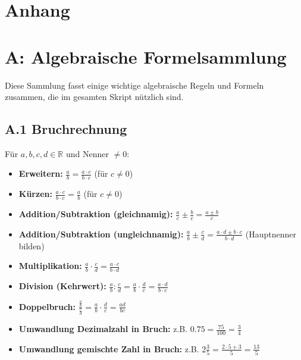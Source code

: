 \appendix
\section*{Anhang} %

\section*{A: Algebraische Formelsammlung}
\label{anhang:formelsammlung}

Diese Sammlung fasst einige wichtige algebraische Regeln und Formeln zusammen, die im gesamten Skript nützlich sind.

\subsection*{A.1 Bruchrechnung}
Für $a, b, c, d \in \mathbb{R}$ und Nenner $\neq 0$:
\begin{itemize}
    \item \textbf{Erweitern:} $\frac{a}{b} = \frac{a \cdot c}{b \cdot c}$ \quad (für $c \neq 0$)
    \item \textbf{Kürzen:} $\frac{a \cdot c}{b \cdot c} = \frac{a}{b}$ \quad (für $c \neq 0$)
    \item \textbf{Addition/Subtraktion (gleichnamig):} $\frac{a}{c} \pm \frac{b}{c} = \frac{a \pm b}{c}$
    \item \textbf{Addition/Subtraktion (ungleichnamig):} $\frac{a}{b} \pm \frac{c}{d} = \frac{a \cdot d \pm b \cdot c}{b \cdot d}$ (Hauptnenner bilden)
    \item \textbf{Multiplikation:} $\frac{a}{b} \cdot \frac{c}{d} = \frac{a \cdot c}{b \cdot d}$
    \item \textbf{Division (Kehrwert):} $\frac{a}{b} : \frac{c}{d} = \frac{a}{b} \cdot \frac{d}{c} = \frac{a \cdot d}{b \cdot c}$
    \item \textbf{Doppelbruch:} $\frac{\frac{a}{b}}{\frac{c}{d}} = \frac{a}{b} \cdot \frac{d}{c} = \frac{ad}{bc}$
    \item \textbf{Umwandlung Dezimalzahl in Bruch:} z.B. $0.75 = \frac{75}{100} = \frac{3}{4}$
    \item \textbf{Umwandlung gemischte Zahl in Bruch:} z.B. $2\frac{3}{5} = \frac{2 \cdot 5 + 3}{5} = \frac{13}{5}$
\end{itemize}


